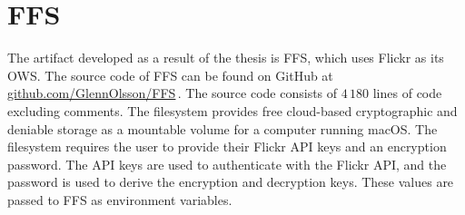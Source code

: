 \section{FFS}
\label{sec:res_ffs}
The artifact developed as a result of the thesis is \gls{FFS}, which uses Flickr as its \gls{OWS}. The source code of \gls{FFS} can be found on GitHub at \href{https://github.com/GlennOlsson/FFS}{github.com/GlennOlsson/FFS}\,\cite{olssonFejkFileSystem2022}. The source code consists of $4\,180$ lines of code excluding comments. The filesystem provides free \mbox{cloud-based} cryptographic and deniable storage as a mountable volume for a computer running macOS. The filesystem requires the user to provide their Flickr \gls{API} keys and an encryption password. The \gls{API} keys are used to authenticate with the Flickr \gls{API}, and the password is used to derive the encryption and decryption keys. These values are passed to \gls{FFS} as environment variables.